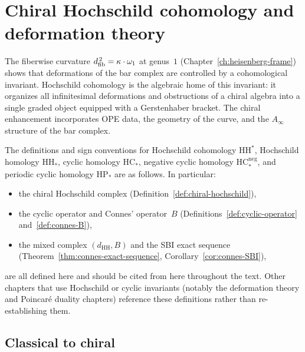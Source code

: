 \chapter{Chiral Hochschild cohomology and deformation theory}


The fiberwise curvature $d_{\mathrm{fib}}^{\,2} = \kappa \cdot \omega_1$ at
genus~$1$ (Chapter~\ref{ch:heisenberg-frame}) shows that deformations
of the bar complex are controlled by a cohomological invariant.
Hochschild cohomology is the algebraic home of this invariant: it
organizes all infinitesimal deformations and obstructions of a chiral
algebra into a single graded object equipped with a Gerstenhaber
bracket.  The chiral enhancement incorporates OPE data, the geometry
of the curve, and the $A_\infty$ structure of the bar complex.

\begin{remark}
\label{rem:hh-hc-canonical-source}
The definitions and sign conventions for Hochschild cohomology
$\mathrm{HH}^*$, Hochschild homology $\mathrm{HH}_*$, cyclic homology
$\mathrm{HC}_*$, negative cyclic homology $\mathrm{HC}_*^{\mathrm{neg}}$,
and periodic cyclic homology $\mathrm{HP}_*$ are as follows.  In particular:
\begin{itemize}
\item the chiral Hochschild complex
  (Definition~\ref{def:chiral-hochschild}),
\item the cyclic operator and Connes' operator~$B$
  (Definitions~\ref{def:cyclic-operator} and~\ref{def:connes-B}),
\item the mixed complex $(d_{\mathrm{HH}}, B)$ and the SBI exact
  sequence (Theorem~\ref{thm:connes-exact-sequence},
  Corollary~\ref{cor:connes-SBI}),
\end{itemize}
are all defined here and should be cited from here throughout the text.
Other chapters that use Hochschild or cyclic invariants
(notably the deformation theory and Poincar\'e duality chapters)
reference these definitions rather than re-establishing them.
\end{remark}

\section{Classical to chiral}

